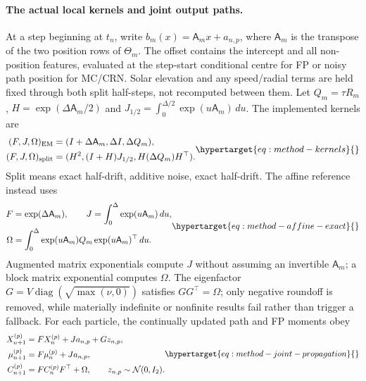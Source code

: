 \paragraph{The actual local kernels and joint output paths.}
At a step beginning at \(t_n\), write
\(b_m(x)=\mathsf A_m x+a_{n,p}\), where \(\mathsf A_m\) is the transpose
of the two position rows of \(\Theta_m\).
The offset contains the intercept and all non-position features, evaluated
at the step-start conditional centre for FP or noisy path position for MC/CRN.
Solar elevation and any speed/radial terms are held fixed through both split
half-steps, not recomputed between them. Let \(Q_m=\tau R_m\),
\(H=\exp(\Delta\mathsf A_m/2)\) and
\(J_{1/2}=\int_0^{\Delta/2}\exp(u\mathsf A_m)\,du\). The implemented kernels are
\begin{equation}
 \begin{aligned}
 (F,J,\Omega)_{\rm EM}&=(I+\Delta\mathsf A_m,\Delta I,\Delta Q_m),\\
 (F,J,\Omega)_{\rm split}&=(H^2,(I+H)J_{1/2},H(\Delta Q_m)H^\top).
 \end{aligned}
 \label{eq:method-kernels}\hypertarget{eq:method-kernels}{}
\end{equation}
Split means exact half-drift, additive noise, exact half-drift. The affine
reference instead uses
\begin{equation}
 \begin{aligned}
 F&=\exp(\Delta\mathsf A_m),\qquad
 J=\int_0^\Delta\exp(u\mathsf A_m)\,du,\\
 \Omega&=\int_0^\Delta\exp(u\mathsf A_m)Q_m
                              \exp(u\mathsf A_m)^\top\,du.
 \end{aligned}
 \label{eq:method-affine-exact}\hypertarget{eq:method-affine-exact}{}
\end{equation}
Augmented matrix exponentials compute \(J\) without assuming an invertible
\(\mathsf A_m\); a block matrix exponential computes \(\Omega\).
The eigenfactor \(G=V\operatorname{diag}(\sqrt{\max(\nu,0)})\) satisfies
\(GG^\top=\Omega\); only negative roundoff is removed, while materially
indefinite or nonfinite results fail rather than trigger a fallback.
For each particle, the continually updated path and FP moments obey
\begin{equation}
 \begin{aligned}
 X_{n+1}^{(p)}&=F X_n^{(p)}+J a_{n,p}+Gz_{n,p},\\
 \mu_{n+1}^{(p)}&=F\mu_n^{(p)}+J a_{n,p},\\
 C_{n+1}^{(p)}&=F C_n^{(p)}F^\top+\Omega,
 \qquad z_{n,p}\sim\mathcal N(0,I_2).
 \end{aligned}
 \label{eq:method-joint-propagation}\hypertarget{eq:method-joint-propagation}{}
\end{equation}
